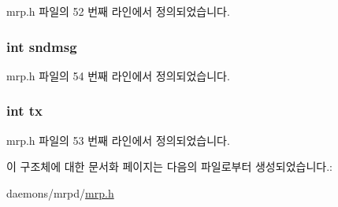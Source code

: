 mrp.\+h 파일의 52 번째 라인에서 정의되었습니다.

\subsubsection[{\texorpdfstring{sndmsg}{sndmsg}}]{\setlength{\rightskip}{0pt plus 5cm}int sndmsg}\hypertarget{structmrp__applicant__attribute_ab5da457547f90222856e97e186840f16}{}\label{structmrp__applicant__attribute_ab5da457547f90222856e97e186840f16}


mrp.\+h 파일의 54 번째 라인에서 정의되었습니다.

\subsubsection[{\texorpdfstring{tx}{tx}}]{\setlength{\rightskip}{0pt plus 5cm}int tx}\hypertarget{structmrp__applicant__attribute_a40590f55f82df430f8035df8dd4f03c2}{}\label{structmrp__applicant__attribute_a40590f55f82df430f8035df8dd4f03c2}


mrp.\+h 파일의 53 번째 라인에서 정의되었습니다.



이 구조체에 대한 문서화 페이지는 다음의 파일로부터 생성되었습니다.\+:\begin{DoxyCompactItemize}
\item 
daemons/mrpd/\hyperlink{mrp_8h}{mrp.\+h}\end{DoxyCompactItemize}
